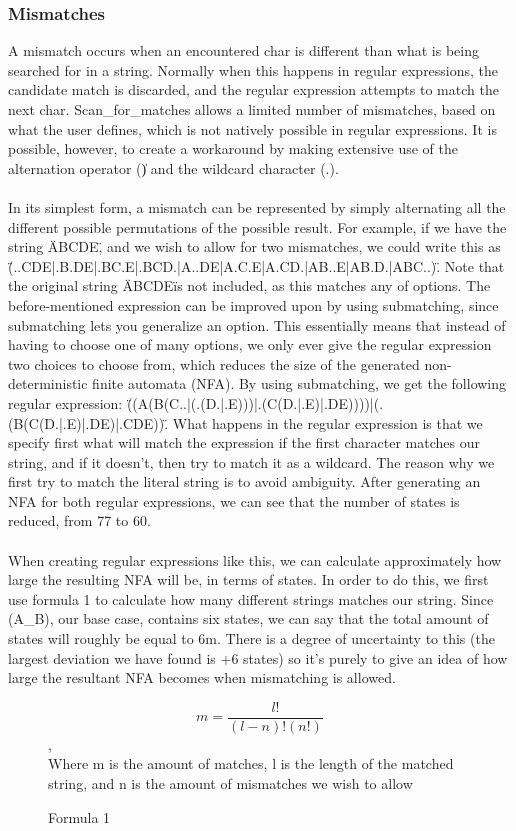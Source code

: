 \subsubsection*{Mismatches}
A mismatch occurs when an encountered char is different than what is being 
searched for in a string. Normally when this happens in regular expressions, 
the candidate match is discarded, and the regular expression attempts to 
match the next char. Scan\_for\_matches allows a limited number 
of mismatches, based on what the user defines, which is not natively possible 
in regular expressions. It is possible, however, to create a workaround by 
making extensive use of the alternation operator (\|) and the wildcard character 
(.).\\\\
In its simplest form, a mismatch can be represented by simply alternating 
all the different possible permutations of the possible result. For example, 
if we have the string \"ABCDE\", and we wish to allow for two mismatches, we 
could write this as \"(..CDE|.B.DE|.BC.E|.BCD.|A..DE|A.C.E|A.CD.|AB..E|AB.D.|ABC..)\". 
Note that the original string \"ABCDE\" is not included, as this matches any of 
options. The before-mentioned expression can be improved upon by using 
submatching, since submatching lets you generalize an option. This essentially 
means that instead of having to choose one of many options, we only ever 
give the regular expression two choices to choose from, which reduces the size 
of the generated non-deterministic finite automata (NFA). By using submatching, 
we get the following regular expression: 
\"((A(B(C..|(.(D.|.E)))|.(C(D.|.E)|.DE))))|(.(B(C(D.|.E)|.DE)|.CDE))\".
What happens in the regular expression is that we specify first what will 
match the expression if the first character matches our string, and if it doesn't, 
then try to match it as a wildcard. The reason why we first try to match 
the literal string is to avoid ambiguity. After generating an NFA for both 
regular expressions, we can see that the number of states is reduced, from 
77 to 60.\\\\
When creating regular expressions like this, we can calculate approximately how 
large the resulting NFA will be, in terms of states. In order to do this, we 
first use formula 1 to calculate how many different strings matches our 
string. Since (A\_B), our base case, contains six states, we can say that 
the total amount of states will roughly be equal to 6m. There is a degree 
of uncertainty to this (the largest deviation we have found is +6 states) 
so it's purely to give an idea of how large the resultant NFA becomes when 
mismatching is allowed.

\begin{figure}
\caption{Formula 1}
$$m = \frac{l!}{(l-n)!(n!)}$$,\\
Where m is the amount of matches, l is the length of the matched string, 
and n is the amount of mismatches we wish to allow
\end{figure}
